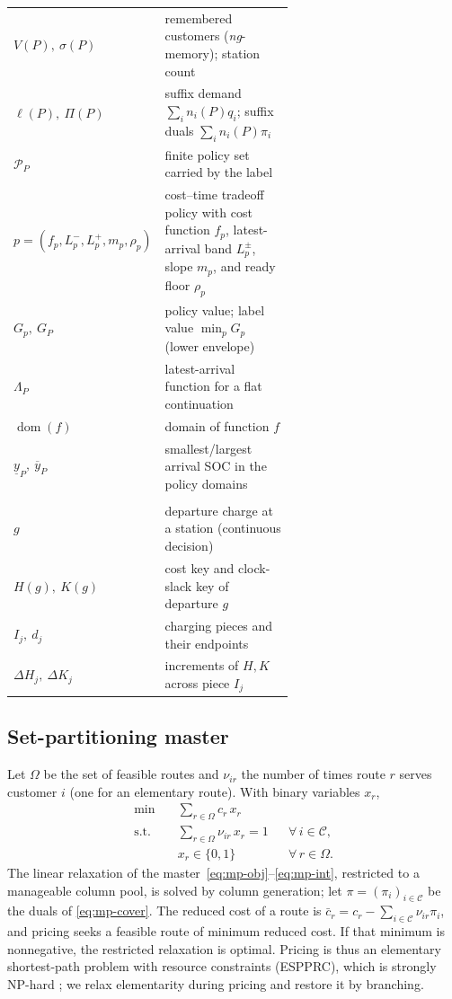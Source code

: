 \documentclass[review,3p,authoryear]{elsarticle}
\theoremstyle{plain}
\theoremstyle{definition}
\theoremstyle{remark}
\newcommand{\C}{\mathcal{C}}
\newcommand{\dom}{\operatorname{dom}}
\newcommand{\rc}{\bar{c}}
\begin{document}
\begin{table}[H]
{\begin{tabular}{@{}l p{0.62\linewidth}@{}}
$V(P),\ \sigma(P)$ & remembered customers (\emph{ng}-memory); station count\\
$\ell(P),\ \Pi(P)$ & suffix demand $\sum_i n_i(P)q_i$; suffix duals $\sum_i n_i(P)\pi_i$\\
$\mathcal P_P$ & finite policy set carried by the label\\
$p=(f_p,L_p^-,L_p^+,m_p,\rho_p)$ & cost--time tradeoff policy with cost function \(f_p\), latest-arrival band \(L_p^\pm\), slope \(m_p\), and ready floor \(\rho_p\)\\
$G_p,\ G_P$ & policy value; label value $\min_{p}G_p$ (lower envelope)\\
\(\Lambda_P\) & latest-arrival function for a flat continuation\\
\(\dom(f)\) & domain of function \(f\)\\
$\underline{y}_P,\ \overline{y}_P$ & smallest/largest arrival SOC in the policy domains\\
\addlinespace[2pt]
\multicolumn{2}{@{}l}{\textit{Continuous charging transform} (\S\ref{sec:continuous})}\\
$g$ & departure charge at a station (continuous decision)\\
$H(g),\ K(g)$ & cost key and clock-slack key of departure $g$\\
$I_j,\ d_j$ & charging pieces and their endpoints\\
$\Delta H_j,\ \Delta K_j$ & increments of $H,K$ across piece $I_j$\\
\bottomrule
\end{tabular}%
}
\end{table}

\subsection{Set-partitioning master}

Let $\Omega$ be the set of feasible routes and $\nu_{ir}$ the number of times route
$r$ serves customer $i$ (one for an elementary route). With binary variables $x_r$,
\begin{align}
\min \quad & \sum_{r\in\Omega} c_r\, x_r \label{eq:mp-obj}\\
\text{s.t.}\quad & \sum_{r\in\Omega} \nu_{ir}\, x_r = 1 && \forall\, i\in\C,
  \label{eq:mp-cover}\\
& x_r \in \{0,1\} && \forall\, r\in\Omega. \label{eq:mp-int}
\end{align}
The linear relaxation of the master~\eqref{eq:mp-obj}--\eqref{eq:mp-int}, restricted
to a manageable column pool, is solved by column
generation; let $\pi=(\pi_i)_{i\in\C}$ be the duals of \eqref{eq:mp-cover}. The
reduced cost of a route is $\rc_r = c_r - \sum_{i\in\C} \nu_{ir}\pi_i$, and pricing
seeks a feasible route of minimum reduced cost. If that minimum is nonnegative, the
restricted relaxation is optimal. Pricing is thus an elementary shortest-path
problem with resource constraints (ESPPRC), which is strongly NP-hard
\citep{Feillet2004}; we relax elementarity during pricing and restore it by
branching.
\end{document}
